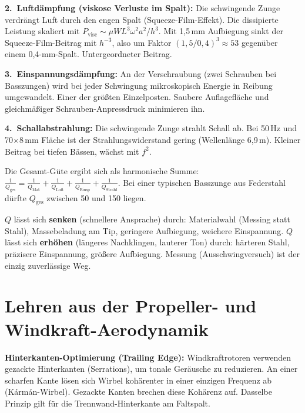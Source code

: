 \documentclass[11pt,a4paper]{article}
\begin{document}
\textbf{2.\ Luftdämpfung (viskose Verluste im Spalt):} Die schwingende Zunge verdrängt Luft durch den engen Spalt (Squeeze-Film-Effekt). Die dissipierte Leistung skaliert mit $P_\text{visc} \sim \mu W L^3 \omega^2 a^2 / h^3$. Mit 1{,}5\,mm Aufbiegung sinkt der Squeeze-Film-Beitrag mit $h^{-3}$, also um Faktor $(1{,}5/0{,}4)^3 \approx 53$ gegenüber einem 0{,}4-mm-Spalt. Untergeordneter Beitrag.

\textbf{3.\ Einspannungsdämpfung:} An der Verschraubung (zwei Schrauben bei Basszungen) wird bei jeder Schwingung mikroskopisch Energie in Reibung umgewandelt. Einer der größten Einzelposten. Saubere Auflagefläche und gleichmäßiger Schrauben-Anpressdruck minimieren ihn.

\textbf{4.\ Schallabstrahlung:} Die schwingende Zunge strahlt Schall ab. Bei 50\,Hz und 70$\times$8\,mm Fläche ist der Strahlungswiderstand gering (Wellenlänge 6{,}9\,m). Kleiner Beitrag bei tiefen Bässen, wächst mit $f^2$.

\begin{keybox}
Die Gesamt-Güte ergibt sich als harmonische Summe: $\frac{1}{Q_\text{ges}} = \frac{1}{Q_\text{Mat}} + \frac{1}{Q_\text{Luft}} + \frac{1}{Q_\text{Einsp}} + \frac{1}{Q_\text{Strahl}}$. Bei einer typischen Basszunge aus Federstahl dürfte $Q_\text{ges}$ zwischen 50 und 150 liegen.
\end{keybox}

$Q$ lässt sich \textbf{senken} (schnellere Ansprache) durch: Materialwahl (Messing statt Stahl), Massebeladung am Tip, geringere Aufbiegung, weichere Einspannung. $Q$ lässt sich \textbf{erhöhen} (längeres Nachklingen, lauterer Ton) durch: härteren Stahl, präzisere Einspannung, größere Aufbiegung. Messung (Ausschwingversuch) ist der einzig zuverlässige Weg.

\section{Lehren aus der Propeller- und Windkraft-Aerodynamik}

\textbf{Hinterkanten-Optimierung (Trailing Edge):} Windkraftrotoren verwenden gezackte Hinterkanten (Serrations), um tonale Geräusche zu reduzieren. An einer scharfen Kante lösen sich Wirbel kohärenter in einer einzigen Frequenz ab (Kármán-Wirbel). Gezackte Kanten brechen diese Kohärenz auf. Dasselbe Prinzip gilt für die Trennwand-Hinterkante am Faltspalt.
\end{document}
